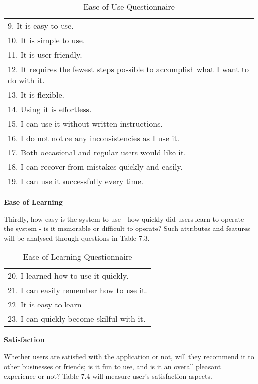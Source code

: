 \begin{table}
\begin{center}
\begin{tabular}{ |l| } 
 \hline
9.	It is easy to use. \\
10.	 It is simple to use. \\
11.	 It is user friendly. \\
12.	 It requires the fewest steps possible to accomplish what I want to do with it.\\
13.	It is flexible. \\
14.	 Using it is effortless. \\
15.	 I can use it without written instructions. \\
16.	I do not notice any inconsistencies as I use it.\\
17.	 Both occasional and regular users would like it.\\
18.	I can recover from mistakes quickly and easily.\\
19.	 I can use it successfully every time.\\
 \hline
 \end{tabular}
 \caption{Ease of Use Questionnaire}
\label{table:2}
\end{center}
\end{table}

\textbf{Ease of Learning}

Thirdly, how easy is the system to use -  how quickly did users learn to operate the system -  is it memorable or difficult to operate? Such attributes and features will be analysed through questions in Table 7.3.

\begin{table}
\begin{center}
\begin{tabular}{ |l| } 
 \hline
20.	I learned how to use it quickly.\\
21.	I can easily remember how to use it.\\
22.	It is easy to learn.\\
23.	I can quickly become skilful with it.\\
 \hline
 \end{tabular}
 \caption{Ease of Learning Questionnaire}
\label{table:3}
\end{center}
\end{table}


\textbf{Satisfaction}

Whether users are satisfied with the application or not, will they recommend it to other businesses or friends;  is it fun to use, and is it an overall pleasant experience or not? Table 7.4 will measure user's satisfaction aspects.

